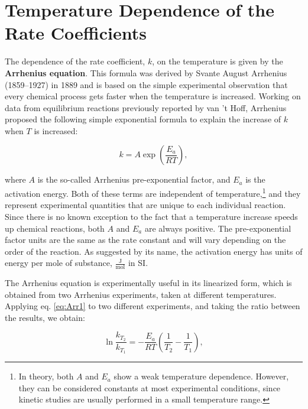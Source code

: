\documentclass[
  9pt,
]{extbook}
\theoremstyle{definition}
\theoremstyle{definition}
\theoremstyle{definition}
\theoremstyle{remark}
\begin{document}
\hypertarget{temperature-dependence-of-the-rate-coefficients}{%
\section{Temperature Dependence of the Rate Coefficients}\label{temperature-dependence-of-the-rate-coefficients}}

The dependence of the rate coefficient, \(k\), on the temperature is given by the \textbf{Arrhenius equation}. This formula was derived by Svante August Arrhenius (1859--1927) in 1889 and is based on the simple experimental observation that every chemical process gets faster when the temperature is increased. Working on data from equilibrium reactions previously reported by van 't Hoff, Arrhenius proposed the following simple exponential formula to explain the increase of \(k\) when \(T\) is increased:

\begin{equation}
k=A\exp\left( \frac{E_a}{RT}\right),
\label{eq:Arr1}
\end{equation}

where \(A\) is the so-called Arrhenius pre-exponential factor, and \(E_a\) is the activation energy. Both of these terms are independent of temperature,\footnote{In theory, both \(A\) and \(E_a\) show a weak temperature dependence. However, they can be considered constants at most experimental conditions, since kinetic studies are usually performed in a small temperature range.} and they represent experimental quantities that are unique to each individual reaction. Since there is no known exception to the fact that a temperature increase speeds up chemical reactions, both \(A\) and \(E_a\) are always positive. The pre-exponential factor units are the same as the rate constant and will vary depending on the order of the reaction. As suggested by its name, the activation energy has units of energy per mole of substance, \(\frac{\mathrm{J}}{\mathrm{mol}}\) in SI.

The Arrhenius equation is experimentally useful in its linearized form, which is obtained from two Arrhenius experiments, taken at different temperatures. Applying eq. \eqref{eq:Arr1} to two different experiments, and taking the ratio between the results, we obtain:

\begin{equation}
\ln \frac{k_{T_2}}{k_{T_1}}=-\frac{E_a}{RT}\left(\frac{1}{T_2}-\frac{1}{T_1}\right),
\label{eq:Arr2}
\end{equation}
\end{document}

